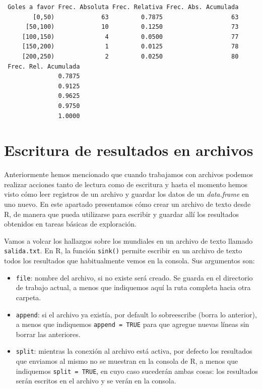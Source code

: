 \documentclass[
]{book}
\providecommand{\tightlist}{%
  \setlength{\itemsep}{0pt}\setlength{\parskip}{0pt}}
\begin{document}
\begin{verbatim}
 Goles a favor Frec. Absoluta Frec. Relativa Frec. Abs. Acumulada
        [0,50)             63         0.7875                   63
      [50,100)             10         0.1250                   73
     [100,150)              4         0.0500                   77
     [150,200)              1         0.0125                   78
     [200,250)              2         0.0250                   80
 Frec. Rel. Acumulada
               0.7875
               0.9125
               0.9625
               0.9750
               1.0000
\end{verbatim}

\hypertarget{escritura-de-resultados-en-archivos}{%
\section{Escritura de resultados en archivos}\label{escritura-de-resultados-en-archivos}}

Anteriormente hemos mencionado que cuando trabajamos con archivos podemos realizar acciones tanto de lectura como de escritura y hasta el momento hemos visto cómo leer registros de un archivo y guardar los datos de un \emph{data.frame} en uno nuevo. En este apartado presentamos cómo crear un archivo de texto desde R, de manera que pueda utilizarse para escribir y guardar allí los resultados obtenidos en tareas básicas de exploración.

Vamos a volcar los hallazgos sobre los mundiales en un archivo de texto llamado \texttt{salida.txt}. En R, la función \texttt{sink()} permite escribir en un archivo de texto todos los resultados que habitualmente vemos en la consola. Sus argumentos son:

\begin{itemize}
\tightlist
\item
  \texttt{file}: nombre del archivo, si no existe será creado. Se guarda en el directorio de trabajo actual, a menos que indiquemos aquí la ruta completa hacia otra carpeta.
\item
  \texttt{append}: si el archivo ya existía, por default lo sobreescribe (borra lo anterior), a menos que indiquemos \texttt{append\ =\ TRUE} para que agregue nuevas líneas sin borrar las anteriores.
\item
  \texttt{split}: mientras la conexión al archivo está activa, por defecto los resultados que enviamos al mismo no se muestran en la consola de R, a menos que indiquemos \texttt{split\ =\ TRUE}, en cuyo caso sucederán ambas cosas: los resultados serán escritos en el archivo y se verán en la consola.
\end{itemize}
\end{document}

